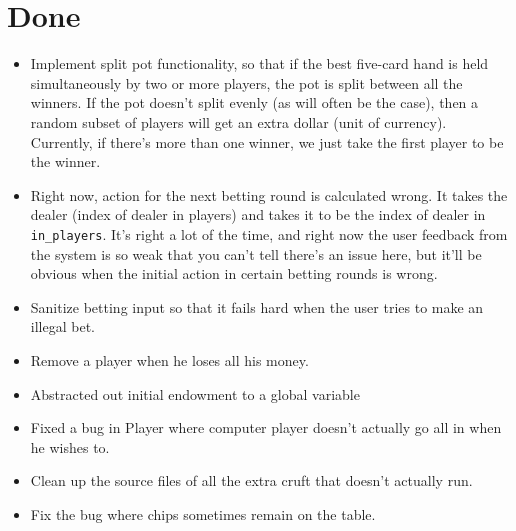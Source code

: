 \documentclass[10pt]{article}
\begin{document}
\section*{Done}
\begin{itemize}
\item \CheckedBox Implement split pot functionality, so that if the best five-card
  hand is held simultaneously by two or more players, the pot is split
  between all the winners. If the pot doesn't split evenly (as will
  often be the case), then a random subset of players will get an
  extra dollar (unit of currency). Currently, if there's more than one
  winner, we just take the first player to be the winner.
\item \CheckedBox Right now, action for the next betting round is calculated
  wrong. It takes the dealer (index of dealer in players) and takes it
  to be the index of dealer in \verb^in_players^. It's right a lot of the
  time, and right now the user feedback from the system is so weak
  that you can't tell there's an issue here, but it'll be obvious when
  the initial action in certain betting rounds is wrong.
\item \CheckedBox Sanitize betting input so that it fails hard when the user tries
  to make an illegal bet.
\item \CheckedBox Remove a player when he loses all his money.
\item \CheckedBox Abstracted out initial endowment to a global variable
\item \CheckedBox Fixed a bug in Player where computer player doesn't
  actually go all in when he wishes to.
\item \CheckedBox Clean up the source files of all the extra cruft that doesn't actually run.
\item \CheckedBox Fix the bug where chips sometimes remain on the table.
\end{itemize}
\end{document}
